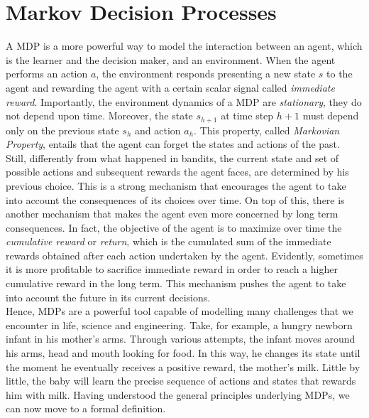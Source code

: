 \section{Markov Decision Processes}
A \gls{MDP} is a more powerful way to model the interaction between an agent, which is the learner and the decision maker, and an environment. When the agent performs an action $a$, the environment responds presenting a new state $s$ to the agent and rewarding the agent with a certain scalar signal called \emph{immediate reward}. Importantly, the environment dynamics of a \gls{MDP} are \emph{stationary}, \ie they do not depend upon time. Moreover, the state $s_{h+1}$ at time step $h+1$ must depend only on the previous state $s_{h}$ and action   $a_{h}$. This property, called \emph{Markovian Property}, entails that the agent can forget the states and actions of the past. Still, differently from what happened in bandits, the current state and set of possible actions and subsequent rewards the agent faces, are determined by his previous choice. This is a strong mechanism that encourages the agent to take into account the consequences of its choices over time. On top of this, there is another mechanism that makes the agent even more concerned by long term consequences. In fact, the objective of the agent is to maximize over time the  \emph{cumulative reward} or \emph{return}, which is the cumulated sum of the immediate rewards obtained after each action undertaken by the agent. Evidently, sometimes it is more profitable to sacrifice immediate reward in order to reach a higher cumulative reward in the long term. This mechanism pushes the agent to take into account the future in its current decisions. \\
Hence, \gls{MDP}s are a powerful tool capable of modelling many challenges that we encounter in life, science and engineering. Take, for example, a hungry newborn infant in his mother's arms. Through various attempts, the infant moves around his arms, head and mouth looking for food. In this way, he changes its state until the moment he eventually receives a positive reward, the mother's milk. Little by little, the baby will learn the precise sequence of actions and states that rewards him with milk. Having understood the general principles underlying \gls{MDP}s, we can now move to a formal definition.

